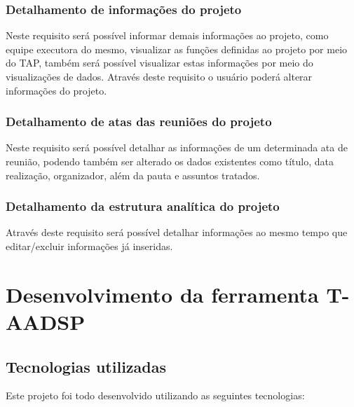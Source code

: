 \documentclass{acm_proc_article-sp}
\begin{document}
\subsubsection{Detalhamento de informações do projeto}
Neste requisito será possível informar demais informações ao projeto, como equipe executora do mesmo, visualizar as funções definidas ao projeto por meio do TAP, também será possível visualizar estas informações por meio do visualizações de dados. Através deste requisito o usuário poderá alterar informações do projeto. 

\subsubsection{Detalhamento de atas das reuniões do projeto}
Neste requisito será possível detalhar as informações de um determinada ata de reunião, podendo também ser alterado os dados existentes como título, data realização, organizador, além da pauta e assuntos tratados.

\subsubsection{Detalhamento da estrutura analítica do projeto}
Através deste requisito será possível detalhar informações ao mesmo tempo que editar/excluir informações já inseridas.

\section{Desenvolvimento da ferramenta T-AADSP}
\subsection{Tecnologias utilizadas}
Este projeto foi todo desenvolvido utilizando as seguintes tecnologias:
\end{document}
